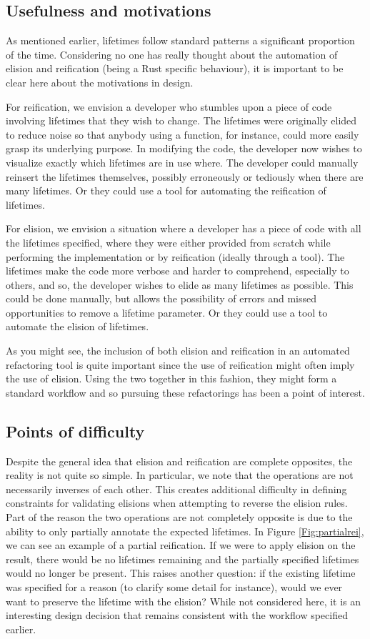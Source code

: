 \subsection{Usefulness and motivations}
As mentioned earlier, lifetimes follow standard patterns a significant proportion of the time. Considering no one has really thought about the automation of elision and reification (being a Rust specific behaviour), it is important to be clear here about the motivations in design. 

For reification, we envision a developer who stumbles upon a piece of code involving lifetimes that they wish to change. The lifetimes were originally elided to reduce noise so that anybody using a function, for instance, could more easily grasp its underlying purpose. In modifying the code, the developer now wishes to visualize exactly which lifetimes are in use where. The developer could manually reinsert the lifetimes themselves, possibly erroneously or tediously when there are many lifetimes. Or they could use a tool for automating the reification of lifetimes.

For elision, we envision a situation where a developer has a piece of code with all the lifetimes specified, where they were either provided from scratch while performing the implementation or by reification (ideally through a tool). The lifetimes make the code more verbose and harder to comprehend, especially to others, and so, the developer wishes to elide as many lifetimes as possible. This could be done manually, but allows the possibility of errors and missed opportunities to remove a lifetime parameter. Or they could use a tool to automate the elision of lifetimes. 

As you might see, the inclusion of both elision and reification in an automated refactoring tool is quite important since the use of reification might often imply the use of elision. Using the two together in this fashion, they might form a standard workflow and so pursuing these refactorings has been a point of interest.

\subsection{Points of difficulty}\label{S:pod}
Despite the general idea that elision and reification are complete opposites, the reality is not quite so simple. In particular, we note that the operations are not necessarily inverses of each other. This creates additional difficulty in defining constraints for validating elisions when attempting to reverse the elision rules. Part of the reason the two operations are not completely opposite is due to the ability to only partially annotate the expected lifetimes. In Figure \ref{Fig:partialrei}, we can see an example of a partial reification. If we were to apply elision on the result, there would be no lifetimes remaining and the partially specified lifetimes would no longer be present. This raises another question: if the existing lifetime was specified for a reason (to clarify some detail for instance), would we ever want to preserve the lifetime with the elision? While not considered here, it is an interesting design decision that remains consistent with the workflow specified earlier. 

